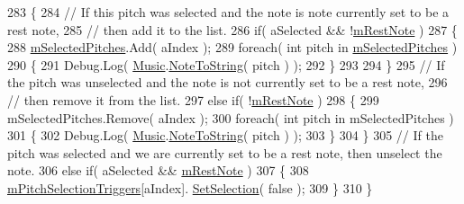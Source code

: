 \begin{DoxyCode}
283         \{
284             \textcolor{comment}{// If this pitch was selected and the note is note currently set to be a rest note,}
285             \textcolor{comment}{// then add it to the list.}
286             \textcolor{keywordflow}{if}( aSelected && !\hyperlink{group___s_c_handlers_gace289a908db9ba443c50ec8656ae05b1}{mRestNote} )
287             \{
288                 \hyperlink{group___s_c_handlers_ga816236cbae1f13ea34be94fb1b86b7cd}{mSelectedPitches}.Add( aIndex );
289                 \textcolor{keywordflow}{foreach}( \textcolor{keywordtype}{int} pitch \textcolor{keywordflow}{in} \hyperlink{group___s_c_handlers_ga816236cbae1f13ea34be94fb1b86b7cd}{mSelectedPitches} )
290                 \{
291                     Debug.Log( \hyperlink{class_music}{Music}.\hyperlink{group___music_stat_func_ga85a22c905d56d4c5f4e62159bfecee8c}{NoteToString}( pitch ) );
292                 \}
293 
294             \}
295             \textcolor{comment}{// If the pitch was unselected and the note is not currently set to be a rest note, }
296             \textcolor{comment}{// then remove it from the list.}
297             \textcolor{keywordflow}{else} \textcolor{keywordflow}{if}( !\hyperlink{group___s_c_handlers_gace289a908db9ba443c50ec8656ae05b1}{mRestNote} )
298             \{
299                 mSelectedPitches.Remove( aIndex );
300                 \textcolor{keywordflow}{foreach}( \textcolor{keywordtype}{int} pitch \textcolor{keywordflow}{in} mSelectedPitches )
301                 \{
302                     Debug.Log( \hyperlink{class_music}{Music}.\hyperlink{group___music_stat_func_ga85a22c905d56d4c5f4e62159bfecee8c}{NoteToString}( pitch ) );
303                 \}
304             \}
305             \textcolor{comment}{// If the pitch was selected and we are currently set to be a rest note, then unselect the
       note.}
306             \textcolor{keywordflow}{else} \textcolor{keywordflow}{if}( aSelected && \hyperlink{group___s_c_handlers_gace289a908db9ba443c50ec8656ae05b1}{mRestNote} )
307             \{
308                 \hyperlink{group___s_c_handlers_ga1affedf973b4aa39505b35053c12df7e}{mPitchSelectionTriggers}[aIndex].
      \hyperlink{group___s_c_handlers_ga0eebfa085bd5326ed4cb4981cf02d2e0}{SetSelection}( \textcolor{keyword}{false} );
309             \}
310         \}
\end{DoxyCode}
\mbox{\label{group___s_c_handlers_gad63b337e8edf4296db87f6753d187f97}} 
